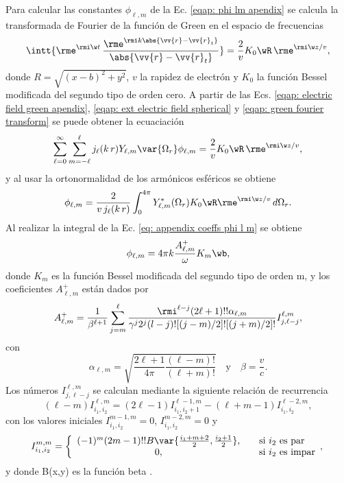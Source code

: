Para calcular las constantes $\phi_{\ell, m}$ de la Ec. \eqref{eqap: phi lm apendix} se calcula la transformada de Fourier de la función de Green en el espacio de frecuencias \cite{maciel2019electromagnetic}
\begin{equation}
\intt{\rme^{\rmi \w t} \,\frac{\rme^{\rmi k \abs{\vv{r}-\vv{r}_t}}}{\abs{\vv{r}-\vv{r}_t}}} = \frac{2}{v} K_0\wR \, \rme^{\rmi \w z/v},
\label{eqap: green fourier transform}
\end{equation}
donde $R = \sqrt{(x-b)^2+y^2}$, $v$ la rapidez de electrón y $K_0$ la función Bessel modificada del segundo tipo de orden cero. A partir de las Ecs. \eqref{eqap: electric field green apendix}, \eqref{eqap: ext electric field spherical} y \eqref{eqap: green fourier transform} se puede obtener la ecuaciación
\begin{equation}
\sum_{\ell=0}^{\infty}\sum_{m=-\ell}^{\ell} j_{\ell}(k \, r) Y_{\ell,m}\var{\Omega_r} \phi_{\ell, m} = \frac{2}{v} K_0\wR \, \rme^{\rmi \w z/v},
\end{equation}
y al usar la ortonormalidad de los armónicos esféricos se obtiene
\begin{equation}
\phi_{\ell,m} = \frac{2}{v \,j_{\ell}(k\,r)} \int_{0}^{4\pi} Y_{\ell,m}^{*}(\Omega_r) K_0\wR \rme^{\rmi \w z /v} \, d\Omega_{r}.
\label{eq: appendix coeffs phi l m}
\end{equation}
Al realizar la integral de la Ec.  \eqref{eq: appendix coeffs phi l m} se obtiene \cite{de1999relativistic}
\begin{equation}
\phi_{\ell,m} = 4\pi k \frac{A_{\ell, m}^{+}}{\omega}K_m\wb,
\label{eq: phi lm GdA AlmKm}
\end{equation}
donde $K_m$ es la función Bessel modificada del segundo tipo de orden m, y los coeficientes $A_{\ell, m}^{+}$ están dados por
\begin{equation}
A_{\ell, m}^{+} = \frac{1}{\beta^{\ell +1}}\sum_{j=m}^{\ell}\frac{\rmi^{\ell - j} (2\ell + 1)!! \alpha_{\ell, m}}{\gamma^j 2^j (l-j)! [(j-m)/2]! [(j+m)/2]! } I_{j, \ell - j}^{\ell, m},
\end{equation}
con
\begin{equation}
\alpha_{\ell, m} = \sqrt{\frac{2\ell + 1}{4\pi}\frac{(\ell-m)!}{(\ell +m)!}} \quad \text{y} \quad \beta = \frac{v}{c}.
\end{equation}
Los números $I_{j, \ell - j}^{\ell, m}$ se calculan mediante la siguiente relación de recurrencia
\begin{equation}
(\ell - m) I_{i_1,i_2}^{\ell,m}=(2\ell-1)I_{i_1,i_2+1}^{\ell-1,m}-(\ell + m -1)I_{i_1,i_2}^{\ell-2,m},
\end{equation}
con los valores iniciales $I_{i_1,i_2}^{m-1,m}=0$, $I_{i_1,i_2}^{m-2,m}=0$ y
\begin{equation}
I_{i_1,i_2}^{m,m} = 
\left\{ 
  \begin{array}{ c l }
    (-1)^m (2m-1)!! B\var{\frac{i_1 + m +2}{2}, \frac{i_2+1}{2}}, & \quad \textrm{si } i_2 \textrm{ es par} \\
    0,                 & \quad \textrm{si } i_2 \textrm{ es impar}
  \end{array},
\right.
\end{equation}
y donde B(x,y) es la función beta \citep{Abramowitz}.

